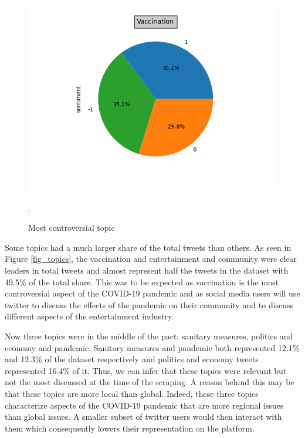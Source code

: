\documentclass[letterpaper]{article} %
\begin{document}
\begin{figure}[t]
\centering
\includegraphics[width=0.9\columnwidth]{fig1} %
\caption{Most controversial topic}.
\label{fig_cont}
\end{figure}



Some topics had a much larger share of the total tweets than others. As seen in
Figure \ref{fig_topics}, the vaccination and entertainment and community were clear leaders in total tweets and almost represent half the tweets in the dataset with 49.5\% of the total share. This was to be expected as vaccination is the most controversial aspect of the COVID-19 pandemic and as social media users will use twitter to discuss the effects of the pandemic on their community and to discuss different aspects of the entertainment industry. 

Now three topics were in the middle of the pact: sanitary measures, politics and economy and pandemic. Sanitary measures and pandemic both represented 12.1\% and 12.3\% of the dataset respectively and politics and economy tweets represented 16.4\% of it. Thus, we can infer that these topics were relevant but not the most discussed at the time of the scraping. A reason behind this may be that these topics are more local than global. Indeed, these three topics characterize aspects of the COVID-19 pandemic that are more regional issues than global issues. A smaller subset of twitter users would then interact with them which consequently lowers their representation on the platform. 
\end{document}
